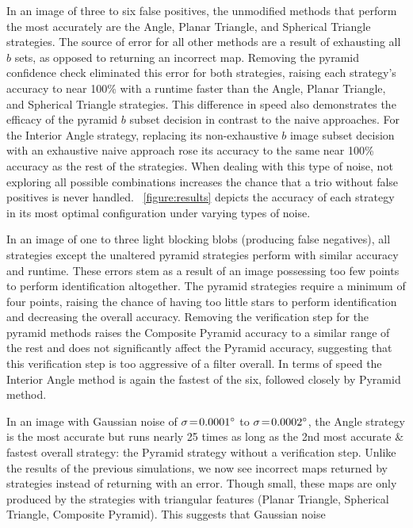 In an image of three to six false positives, the unmodified methods that perform the most accurately are the Angle, Planar Triangle, and Spherical Triangle strategies.
The source of error for all other methods are a result of exhausting all $b$ sets, as opposed to returning an incorrect map.
Removing the pyramid confidence check eliminated this error for both strategies, raising each strategy's accuracy to near 100\% with a runtime faster than the Angle, Planar Triangle, and Spherical Triangle strategies.
This difference in speed also demonstrates the efficacy of the pyramid $b$ subset decision in contrast to the naive approaches.
For the Interior Angle strategy, replacing its non-exhaustive $b$ image subset decision with an exhaustive naive approach rose its accuracy to the same near 100\% accuracy as the rest of the strategies.
When dealing with this type of noise, not exploring all possible combinations increases the chance that a trio without false positives is never handled.
~\autoref{figure:results} depicts the accuracy of each strategy in its most optimal configuration under varying types of noise.

In an image of one to three light blocking blobs (producing false negatives), all strategies except the unaltered pyramid strategies perform with similar accuracy and runtime.
These errors stem as a result of an image possessing too few points to perform identification altogether.
The pyramid strategies require a minimum of four points, raising the chance of having too little stars to perform identification and decreasing the overall accuracy.
Removing the verification step for the pyramid methods raises the Composite Pyramid accuracy to a similar range of the rest and does not significantly affect the Pyramid accuracy, suggesting that this verification step is too aggressive of a filter overall.
In terms of speed the Interior Angle method is again the fastest of the six, followed closely by Pyramid method.

In an image with Gaussian noise of $\sigma \!=\! 0.0001^\circ$ to $\sigma \!=\! 0.0002^\circ$, the Angle strategy is the most accurate but runs nearly 25 times as long as the 2nd most accurate \& fastest overall strategy: the Pyramid strategy without a verification step.
Unlike the results of the previous simulations, we now see incorrect maps returned by strategies instead of returning with an error.
Though small, these maps are only produced by the strategies with triangular features (Planar Triangle, Spherical Triangle, Composite Pyramid).
This suggests that Gaussian noise 

